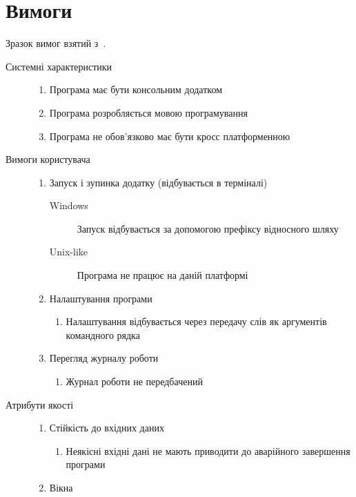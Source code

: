 \section{Вимоги}
Зразок вимог взятий з~\cite{kulikov}. 
\begin{description}
	\item[Системні характеристики]\directenv%
		\begin{enumerate}
			\item Програма має бути консольним додатком
			\item Програма розробляється мовою програмування  
			\item Програма не обов'язково має бути кросс платформенною
		\end{enumerate}
	\item[Вимоги користувача]\directenv%
		\begin{enumerate}
			\item Запуск і зупинка додатку (відбувається в терміналі)
				\begin{description}
					\item[Windows]
						Запуск відбувається за допомогою префіксу відносного шляху 
					\item[Unix-like]
						Програма не працює на даній платформі
				\end{description}
			\item Налаштування програми
				\begin{enumerate}
					\item Налаштування відбувається через передачу слів як аргументів командного рядка
				\end{enumerate}
			\item Перегляд журналу роботи
				\begin{enumerate}
					\item Журнал роботи не передбачений
				\end{enumerate}
		\end{enumerate}
	\item[Атрибути якості]\directenv%
		\begin{enumerate}
			\item Стійкість до вхідних даних
				\begin{enumerate}
					\item Неякісні вхідні дані не мають приводити до аварійного завершення програми
				\end{enumerate}
			\item Вікна
				\begin{enumerate}

\end{enumerate}
\end{enumerate}
\end{description}
